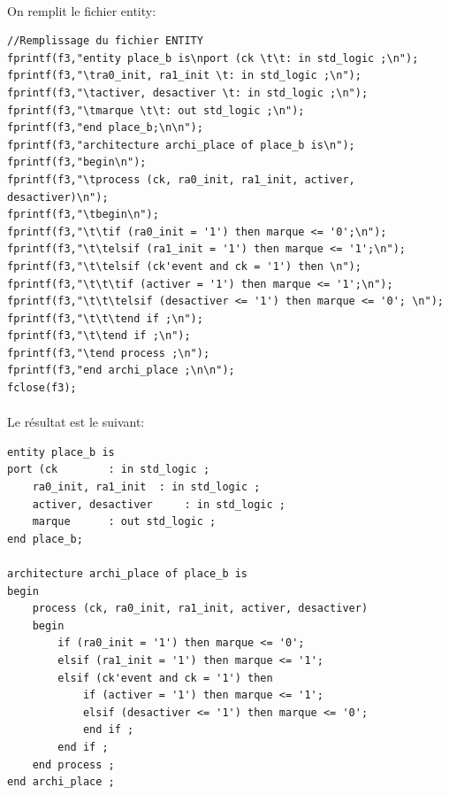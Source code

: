 \paragraph{} On remplit le fichier entity:\\[0.25 cm]

\begin{lstlisting}
//Remplissage du fichier ENTITY
fprintf(f3,"entity place_b is\nport (ck \t\t: in std_logic ;\n");
fprintf(f3,"\tra0_init, ra1_init \t: in std_logic ;\n");
fprintf(f3,"\tactiver, desactiver \t: in std_logic ;\n");
fprintf(f3,"\tmarque \t\t: out std_logic ;\n");
fprintf(f3,"end place_b;\n\n");
fprintf(f3,"architecture archi_place of place_b is\n");
fprintf(f3,"begin\n");
fprintf(f3,"\tprocess (ck, ra0_init, ra1_init, activer, desactiver)\n");
fprintf(f3,"\tbegin\n");
fprintf(f3,"\t\tif (ra0_init = '1') then marque <= '0';\n");
fprintf(f3,"\t\telsif (ra1_init = '1') then marque <= '1';\n");
fprintf(f3,"\t\telsif (ck'event and ck = '1') then \n");
fprintf(f3,"\t\t\tif (activer = '1') then marque <= '1';\n");
fprintf(f3,"\t\t\telsif (desactiver <= '1') then marque <= '0'; \n");
fprintf(f3,"\t\t\tend if ;\n");
fprintf(f3,"\t\tend if ;\n");
fprintf(f3,"\tend process ;\n");
fprintf(f3,"end archi_place ;\n\n");
fclose(f3);
\end{lstlisting}
\break
\paragraph{} Le résultat est le suivant:\\[0.25 cm]

\begin{lstlisting}[style=vhdl]
entity place_b is
port (ck 		: in std_logic ;
	ra0_init, ra1_init 	: in std_logic ;
	activer, desactiver 	: in std_logic ;
	marque 		: out std_logic ;
end place_b;

architecture archi_place of place_b is
begin
	process (ck, ra0_init, ra1_init, activer, desactiver)
	begin
		if (ra0_init = '1') then marque <= '0';
		elsif (ra1_init = '1') then marque <= '1';
		elsif (ck'event and ck = '1') then 
			if (activer = '1') then marque <= '1';
			elsif (desactiver <= '1') then marque <= '0'; 
			end if ;
		end if ;
	end process ;
end archi_place ;
\end{lstlisting}

